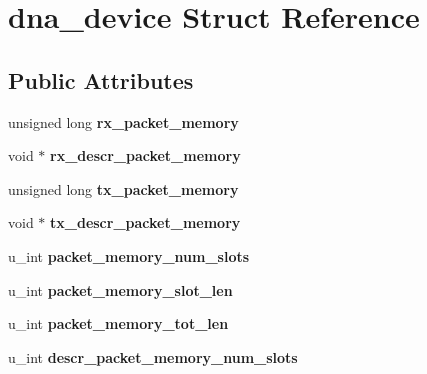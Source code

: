 \hypertarget{structdna__device}{
\section{dna\_\-device Struct Reference}
\label{structdna__device}
}
\subsection*{Public Attributes}
\begin{DoxyCompactItemize}
\item 
\hypertarget{structdna__device_a4b7e7567440faca8120f9a54e5e8318e}{
unsigned long {\bfseries rx\_\-packet\_\-memory}}
\label{structdna__device_a4b7e7567440faca8120f9a54e5e8318e}

\item 
\hypertarget{structdna__device_a33a92228067f6479601a589d7895e2be}{
void $\ast$ {\bfseries rx\_\-descr\_\-packet\_\-memory}}
\label{structdna__device_a33a92228067f6479601a589d7895e2be}

\item 
\hypertarget{structdna__device_aaaf9e2d920775b2adfe8df04bf567154}{
unsigned long {\bfseries tx\_\-packet\_\-memory}}
\label{structdna__device_aaaf9e2d920775b2adfe8df04bf567154}

\item 
\hypertarget{structdna__device_a7d795af618b3a22c4bb7a5f605ff7a29}{
void $\ast$ {\bfseries tx\_\-descr\_\-packet\_\-memory}}
\label{structdna__device_a7d795af618b3a22c4bb7a5f605ff7a29}

\item 
\hypertarget{structdna__device_aa40b13f8d9960196b45c5af08d11bfa7}{
u\_\-int {\bfseries packet\_\-memory\_\-num\_\-slots}}
\label{structdna__device_aa40b13f8d9960196b45c5af08d11bfa7}

\item 
\hypertarget{structdna__device_a825b939a9246a19fe7352218a320f4c4}{
u\_\-int {\bfseries packet\_\-memory\_\-slot\_\-len}}
\label{structdna__device_a825b939a9246a19fe7352218a320f4c4}

\item 
\hypertarget{structdna__device_a22bc976fc0d2f3f427f5c322ead86964}{
u\_\-int {\bfseries packet\_\-memory\_\-tot\_\-len}}
\label{structdna__device_a22bc976fc0d2f3f427f5c322ead86964}

\item 
\hypertarget{structdna__device_a328ce64a8e78b3bf7d39c3d7e4216747}{
u\_\-int {\bfseries descr\_\-packet\_\-memory\_\-num\_\-slots}}
\label{structdna__device_a328ce64a8e78b3bf7d39c3d7e4216747}


\end{DoxyCompactItemize}
